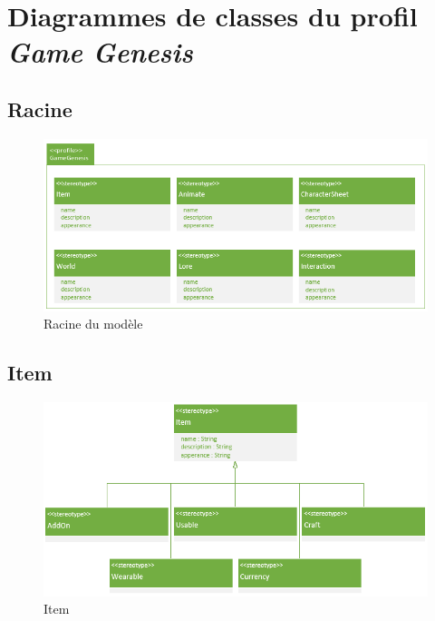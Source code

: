 \appendix
\chapter{Diagrammes de classes du profil \emph{Game Genesis}}
\label{AnnexeA}

\section{Racine}
\begin{figure}[H]
    \begin{center}
    \includegraphics[width=14cm]{10_img/Z_annexeA/00.PNG}
    \caption{Racine du modèle}
    \label{A-racine}
    \end{center}
\end{figure}

\newpage
\section{Item}
\begin{figure}[H]
    \begin{center}
    \includegraphics[width=\linewidth]{10_img/Z_annexeA/item_racine.PNG}
    \caption{Item}
    \label{A-item-racine}
    \end{center}
\end{figure}

